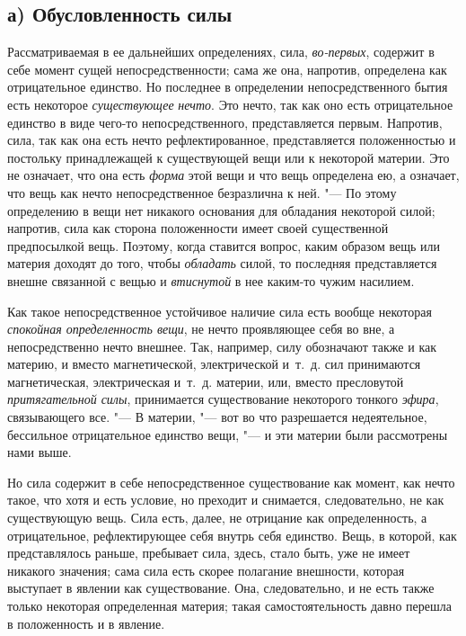 \subsection[а) Обусловленность силы]{а) Обусловленность силы}

Рассматриваемая в ее дальнейших определениях,
сила, {\em во-первых}, содержит в себе момент сущей
непосредственности; сама же она, напротив, определена как отрицательное
единство. Но последнее в определении непосредственного бытия есть некоторое
{\em существующее} {\em нечто}. Это
нечто, так как оно есть отрицательное единство в виде чего-то
непосредственного, представляется первым. Напротив, сила, так как она есть
нечто рефлектированное, представляется положенностью и постольку
принадлежащей к существующей вещи или к некоторой материи. Это не означает,
что она есть {\em форма} этой вещи и что вещь
определена ею, а означает, что вещь как нечто непосредственное безразлична
к ней. "--- По этому определению в вещи нет никакого основания для обладания
некоторой силой; напротив, сила как сторона положенности имеет своей
существенной предпосылкой вещь. Поэтому, когда ставится вопрос, каким
образом вещь или материя доходят до того, чтобы
{\em обладать} силой, то последняя представляется
внешне связанной с вещью и {\em втиснутой} в нее
каким-то чужим насилием.

Как такое непосредственное устойчивое наличие сила есть вообще некоторая
{\em спокойная определенность вещи}, не нечто
проявляющее себя во вне, а непосредственно нечто внешнее. Так, например,
силу обозначают также и как материю, и вместо магнетической, электрической
и~т.~д. сил принимаются магнетическая, электрическая и~т.~д. материи, или,
вместо пресловутой {\em притягательной силы},
принимается существование некоторого тонкого
{\em эфира}, связывающего все. "--- В материи, "--- вот во
что разрешается недеятельное, бессильное отрицательное единство вещи, "--- и
эти материи были рассмотрены нами выше.

Но сила содержит в себе непосредственное существование как момент, как нечто
такое, что хотя и есть условие, но преходит и снимается, следовательно, не
как существующую вещь. Сила есть, далее, не отрицание как определенность, а
отрицательное, рефлектирующее себя внутрь себя единство. Вещь, в которой,
как представлялось раньше, пребывает сила, здесь, стало быть, уже не имеет
никакого значения; сама сила есть скорее полагание внешности, которая
выступает в явлении как существование. Она, следовательно, и не есть также
только некоторая определенная материя; такая самостоятельность давно
перешла в положенность и в явление.

